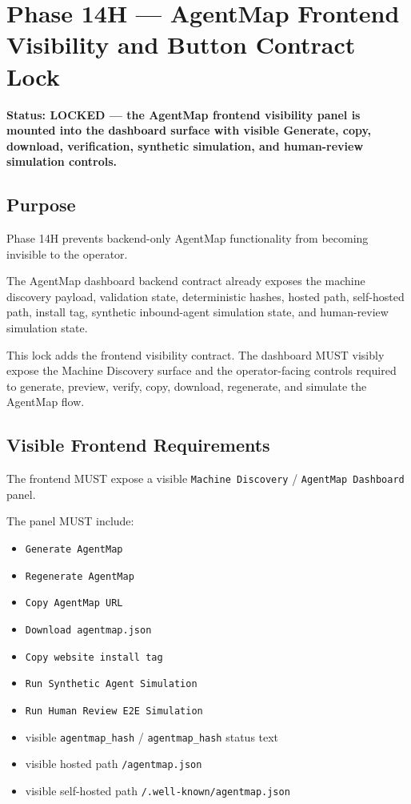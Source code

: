 \section{Phase 14H --- AgentMap Frontend Visibility and Button Contract Lock}
\label{sec:phase14-agentmap-frontend-visibility-lock}

\textbf{Status: LOCKED --- the AgentMap frontend visibility panel is mounted into the dashboard surface with visible Generate, copy, download, verification, synthetic simulation, and human-review simulation controls.}

\subsection{Purpose}

Phase 14H prevents backend-only AgentMap functionality from becoming invisible to the operator.

The AgentMap dashboard backend contract already exposes the machine discovery payload, validation state, deterministic hashes, hosted path, self-hosted path, install tag, synthetic inbound-agent simulation state, and human-review simulation state.

This lock adds the frontend visibility contract. The dashboard MUST visibly expose the Machine Discovery surface and the operator-facing controls required to generate, preview, verify, copy, download, regenerate, and simulate the AgentMap flow.

\subsection{Visible Frontend Requirements}

The frontend MUST expose a visible \texttt{Machine Discovery} / \texttt{AgentMap Dashboard} panel.

The panel MUST include:

\begin{itemize}
  \item \texttt{Generate AgentMap}
  \item \texttt{Regenerate AgentMap}
  \item \texttt{Copy AgentMap URL}
  \item \texttt{Download agentmap.json}
  \item \texttt{Copy website install tag}
  \item \texttt{Run Synthetic Agent Simulation}
  \item \texttt{Run Human Review E2E Simulation}
  \item visible \texttt{agentmap\_hash} / \texttt{agentmap_hash} status text
  \item visible hosted path \texttt{/agentmap.json}
  \item visible self-hosted path \texttt{/.well-known/agentmap.json}
\end{itemize}

